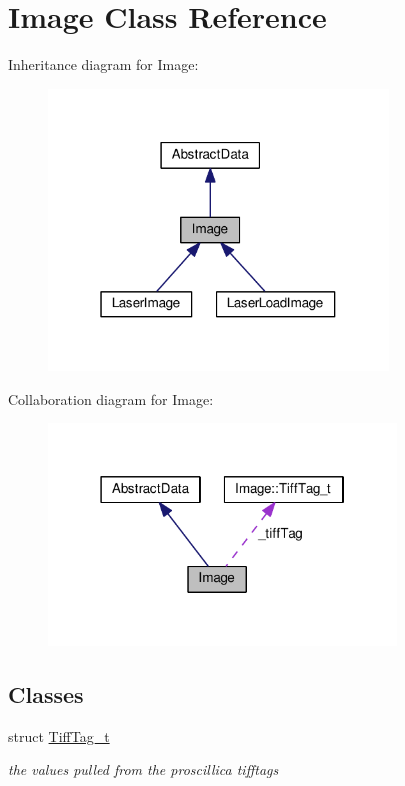 \hypertarget{classImage}{}\section{Image Class Reference}
\label{classImage}


Inheritance diagram for Image\+:\nopagebreak
\begin{figure}[H]
\begin{center}
\leavevmode
\includegraphics[width=256pt]{classImage__inherit__graph}
\end{center}
\end{figure}


Collaboration diagram for Image\+:\nopagebreak
\begin{figure}[H]
\begin{center}
\leavevmode
\includegraphics[width=262pt]{classImage__coll__graph}
\end{center}
\end{figure}
\subsection*{Classes}
\begin{DoxyCompactItemize}
\item 
struct \hyperlink{structImage_1_1TiffTag__t}{Tiff\+Tag\+\_\+t}
\begin{DoxyCompactList}\small\item\em the values pulled from the proscillica tifftags \end{DoxyCompactList}\end{DoxyCompactItemize}
